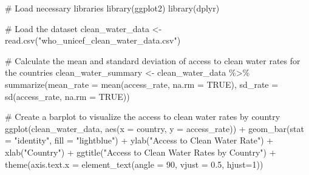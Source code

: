 \documentclass[
  letterpaper,
  DIV=11,
  numbers=noendperiod]{scrreprt}
\newenvironment{Shaded}{\begin{snugshade}}{\end{snugshade}}
\newcommand{\AttributeTok}[1]{\textcolor[rgb]{0.40,0.45,0.13}{#1}}
\newcommand{\CommentTok}[1]{\textcolor[rgb]{0.37,0.37,0.37}{#1}}
\newcommand{\ConstantTok}[1]{\textcolor[rgb]{0.56,0.35,0.01}{#1}}
\newcommand{\DecValTok}[1]{\textcolor[rgb]{0.68,0.00,0.00}{#1}}
\newcommand{\FloatTok}[1]{\textcolor[rgb]{0.68,0.00,0.00}{#1}}
\newcommand{\FunctionTok}[1]{\textcolor[rgb]{0.28,0.35,0.67}{#1}}
\newcommand{\NormalTok}[1]{\textcolor[rgb]{0.00,0.23,0.31}{#1}}
\newcommand{\OtherTok}[1]{\textcolor[rgb]{0.00,0.23,0.31}{#1}}
\newcommand{\SpecialCharTok}[1]{\textcolor[rgb]{0.37,0.37,0.37}{#1}}
\newcommand{\StringTok}[1]{\textcolor[rgb]{0.13,0.47,0.30}{#1}}
\begin{document}
\begin{Shaded}
\begin{Highlighting}[]
\CommentTok{\# Load necessary libraries}
\FunctionTok{library}\NormalTok{(ggplot2)}
\FunctionTok{library}\NormalTok{(dplyr)}

\CommentTok{\# Load the dataset}
\NormalTok{clean\_water\_data }\OtherTok{\textless{}{-}} \FunctionTok{read.csv}\NormalTok{(}\StringTok{"who\_unicef\_clean\_water\_data.csv"}\NormalTok{)}

\CommentTok{\# Calculate the mean and standard deviation of access to clean water rates for the countries}
\NormalTok{clean\_water\_summary }\OtherTok{\textless{}{-}}\NormalTok{ clean\_water\_data }\SpecialCharTok{\%\textgreater{}\%}
  \FunctionTok{summarize}\NormalTok{(}\AttributeTok{mean\_rate =} \FunctionTok{mean}\NormalTok{(access\_rate, }\AttributeTok{na.rm =} \ConstantTok{TRUE}\NormalTok{),}
            \AttributeTok{sd\_rate =} \FunctionTok{sd}\NormalTok{(access\_rate, }\AttributeTok{na.rm =} \ConstantTok{TRUE}\NormalTok{))}

\CommentTok{\# Create a barplot to visualize the access to clean water rates by country}
\FunctionTok{ggplot}\NormalTok{(clean\_water\_data, }\FunctionTok{aes}\NormalTok{(}\AttributeTok{x =}\NormalTok{ country, }\AttributeTok{y =}\NormalTok{ access\_rate)) }\SpecialCharTok{+}
  \FunctionTok{geom\_bar}\NormalTok{(}\AttributeTok{stat =} \StringTok{"identity"}\NormalTok{, }\AttributeTok{fill =} \StringTok{"lightblue"}\NormalTok{) }\SpecialCharTok{+}
  \FunctionTok{ylab}\NormalTok{(}\StringTok{"Access to Clean Water Rate"}\NormalTok{) }\SpecialCharTok{+} \FunctionTok{xlab}\NormalTok{(}\StringTok{"Country"}\NormalTok{) }\SpecialCharTok{+} 
  \FunctionTok{ggtitle}\NormalTok{(}\StringTok{"Access to Clean Water Rates by Country"}\NormalTok{) }\SpecialCharTok{+} 
  \FunctionTok{theme}\NormalTok{(}\AttributeTok{axis.text.x =} \FunctionTok{element\_text}\NormalTok{(}\AttributeTok{angle =} \DecValTok{90}\NormalTok{, }\AttributeTok{vjust =} \FloatTok{0.5}\NormalTok{, }\AttributeTok{hjust=}\DecValTok{1}\NormalTok{))}


\end{Highlighting}
\end{Shaded}
\end{document}
